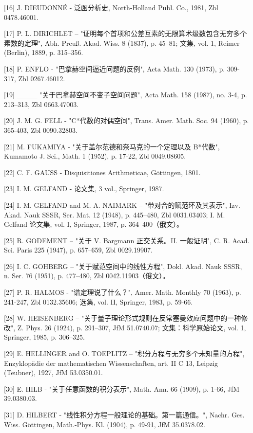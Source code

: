 {[}16{]} J. DIEUDONNÉ - 泛函分析史, North-Holland Publ. Co., 1981, Zbl 0478.46001.

{[}17{]} P. L. DIRICHLET -- "证明每个首项和公差互素的无限算术级数包含无穷多个素数的定理", Abh. Preuß. Akad. Wiss. 8 (1837), p. 45--81; 文集, vol. 1, Reimer (Berlin), 1889, p. 315--356.

{[}18{]} P. ENFLO - "巴拿赫空间逼近问题的反例", Acta Math. 130 (1973), p. 309-317, Zbl 0267.46012.

{[}19{]} \_\_\_\_ "关于巴拿赫空间不变子空间问题", Acta Math. 158 (1987), no. 3-4, p. 213--313, Zbl 0663.47003.

{[}20{]} J. M. G. FELL - "C*代数的对偶空间", Trans. Amer. Math. Soc. 94 (1960), p. 365-403, Zbl 0090.32803.

{[}21{]} M. FUKAMIYA - "关于盖尔范德和奈马克的一个定理以及 B*代数", Kumamoto J. Sci., Math. 1 (1952), p. 17-22, Zbl 0049.08605.

{[}22{]} C. F. GAUSS - Disquisitiones Arithmeticae, Göttingen, 1801.

{[}23{]} I. M. GELFAND - 论文集, 3 vol., Springer, 1987.

{[}24{]} I. M. GELFAND and M. A. NAIMARK -- "带对合的赋范环及其表示", Izv. Akad. Nauk SSSR, Ser. Mat. 12 (1948), p. 445--480, Zbl 0031.03403; I. M. Gelfand 论文集, vol. I, Springer, 1987, p. 364--400（俄文）。

{[}25{]} R. GODEMENT -- "关于 V. Bargmann 正交关系。II. 一般证明", C. R. Acad. Sci. Paris 225 (1947), p. 657--659, Zbl 0029.19907.

{[}26{]} I. C. GOHBERG -- "关于赋范空间中的线性方程", Dokl. Akad. Nauk SSSR, n. Ser. 76 (1951), p. 477--480, Zbl 0042.11903（俄文）。

{[}27{]} P. R. HALMOS - "谱定理说了什么？", Amer. Math. Monthly 70 (1963), p. 241-247, Zbl 0132.35606; 选集, vol. II, Springer, 1983, p. 59-66.

{[}28{]} W. HEISENBERG -- "关于量子理论形式规则在反常塞曼效应问题中的一种修改", Z. Phys. 26 (1924), p. 291--307, JfM 51.0740.07; 文集：科学原始论文, vol. 1, Springer, 1985, p. 306--325.

{[}29{]} E. HELLINGER and O. TOEPLITZ -- "积分方程与无穷多个未知量的方程", Enzyklopädie der mathematischen Wissenschaften, art. II C 13, Leipzig (Teubner), 1927, JfM 53.0350.01.

{[}30{]} E. HILB - "关于任意函数的积分表示", Math. Ann. 66 (1909), p. 1-66, JfM 39.0380.03.

{[}31{]} D. HILBERT - "线性积分方程一般理论的基础。第一篇通信。", Nachr. Ges. Wiss. Göttingen, Math.-Phys. Kl. (1904), p. 49-91, JfM 35.0378.02.

